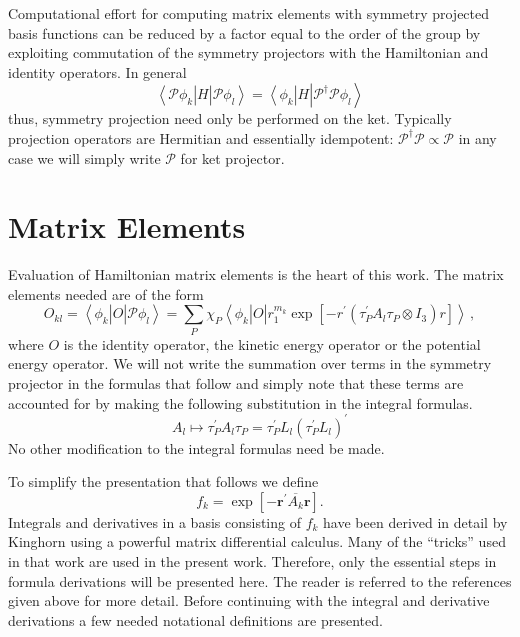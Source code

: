 \documentclass[12pt]{article}
\begin{document}
Computational effort for computing matrix elements with symmetry projected
basis functions can be reduced by a factor equal to the order of the group by
exploiting commutation of the symmetry projectors with the Hamiltonian and
identity operators. In general
\begin{equation}
\left\langle \mathcal{P}\phi_{k}\right|  H\left|  \mathcal{P}\phi
_{l}\right\rangle =\left\langle \phi_{k}\right|  H\left|  \mathcal{P}%
^{\dagger}\mathcal{P}\phi_{l}\right\rangle
\end{equation}
thus, symmetry projection need only be performed on the ket. Typically
projection operators are Hermitian and essentially idempotent: $\mathcal{P}%
^{\dagger}\mathcal{P}\varpropto\mathcal{P}$ in any case we will simply write
$\mathcal{P}$ for ket projector.

\section{Matrix Elements}

Evaluation of Hamiltonian matrix elements is the heart of this work. The
matrix elements needed are of the form
\[
O_{kl}=\left\langle \phi_{k}\right|  O\left|  \mathcal{P}\phi_{l}\right\rangle
=\sum_{P}\chi_{P}\left\langle \phi_{k}\right|  O\left|  r_{1}^{m_{k}}%
\exp\left[  -r^{\prime}\left(  \tau_{P}^{\prime}A_{l}\tau_{P}\otimes
I_{3}\right)  r\right]  \right\rangle \,,
\]
where $O$ is the identity operator, the kinetic energy operator or the
potential energy operator. We will not write the summation over terms in the
symmetry projector in the formulas that follow and simply note that these
terms are accounted for by making the following substitution in the integral
formulas.
\begin{equation}
A_{l}\mapsto\tau_{P}^{\prime}A_{l}\tau_{P}=\tau_{P}^{\prime}L_{l}\left(
\tau_{P}^{\prime}L_{l}\right)  ^{\prime}%
\end{equation}
No other modification to the integral formulas need be made.

To simplify the presentation that follows we define
\begin{equation}
f_{k}=\exp\left[  -\mathbf{r}^{\prime}\overline{A_{k}}\mathbf{r}\right]  .
\end{equation}
Integrals and derivatives in a basis consisting of $f_{k}$ have been derived
in detail by Kinghorn\cite{Kinghorn95a,Kinghorn95b} using a powerful matrix
differential calculus. Many of the ``tricks'' used in that work are used in
the present work. Therefore, only the essential steps in formula derivations
will be presented here. The reader is referred to the references given above
for more detail. Before continuing with the integral and derivative
derivations a few needed notational definitions are presented.
\end{document}
